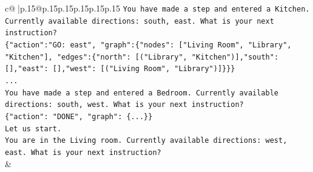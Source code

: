 \documentclass{article}
\begin{document}
{\begin{supertabular}{c@{$\;$}|p{.15\linewidth}@{}p{.15\linewidth}p{.15\linewidth}p{.15\linewidth}p{.15\linewidth}p{.15\linewidth}}
{{{\texttt{You have made a step and entered a Kitchen. Currently available directions: south, east. What is your next instruction?} \\
\texttt{\{"action":"GO: east", "graph":\{"nodes": {[}"Living Room", "Library", "Kitchen"{]}, "edges":\{"north": {[}("Library", "Kitchen"){]},"south": {[}{]},"east": {[}{]},"west": {[}("Living Room", "Library"){]}\}\}\}} \\
\texttt{...} \\
\texttt{You have made a step and entered a Bedroom. Currently available directions: south, west. What is your next instruction?} \\
\texttt{\{"action": "DONE", "graph": \{...\}\}} \\
\texttt{Let us start.} \\
\texttt{You are in the Living room. Currently available directions: west, east. What is your next instruction?} \\
            }
        }
    }
    & \\ \\


\end{supertabular}}
\end{document}
